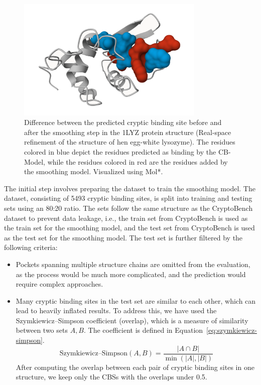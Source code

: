 \begin{figure}
    \centering
    \includegraphics[width=0.8\textwidth]{img/smoothing-difference.png}
    \caption{Difference between the predicted cryptic binding site before and after the smoothing step in the 1LYZ protein structure (Real-space refinement of the structure of hen egg-white lysozyme). The residues colored in blue depict the residues predicted as binding by the CB-Model, while the residues colored in red are the residues added by the smoothing model. Visualized using Mol*.}
    \label{fig:smoothing-difference}
\end{figure}

The initial step involves preparing the dataset to train the smoothing model. The dataset, consisting of 5493 cryptic binding sites, is split into training and testing sets using an 80:20 ratio. The sets follow the same structure as the CryptoBench dataset to prevent data leakage, i.e., the train set from CryptoBench is used as the train set for the smoothing model, and the test set from CryptoBench is used as the test set for the smoothing model. The test set is further filtered by the following criteria:

\begin{itemize}
    \item Pockets spanning multiple structure chains are omitted from the evaluation, as the process would be much more complicated, and the prediction would require complex approaches.
    \item Many cryptic binding sites in the test set are similar to each other, which can lead to heavily inflated results. To address this, we have used the Szymkiewicz–Simpson coefficient (overlap), which is a measure of similarity between two sets $A, B$. The coefficient is defined in Equation~\ref{eq:szymkiewicz-simpson}.
    \begin{equation}
        \text{Szymkiewicz–Simpson}(A, B) = \frac{|A \cap B|}{\min(|A|, |B|)}
        \label{eq:szymkiewicz-simpson}
    \end{equation}
    After computing the overlap between each pair of cryptic binding sites in one structure, we keep only the CBSs with the overlaps under 0.5.
\end{itemize}

